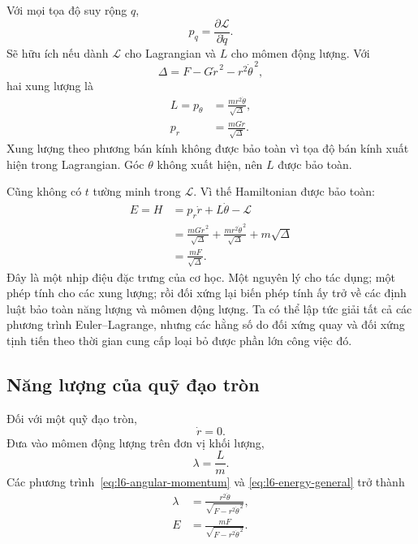 Với mọi tọa độ suy rộng \(q\),
\begin{equation}
p_q=\frac{\partial\mathcal L}{\partial\dot q}.
\end{equation}
Sẽ hữu ích nếu dành \(\mathcal L\) cho Lagrangian và \(L\) cho mômen động lượng. Với
\begin{equation}
\Delta=F-G\dot r^{\,2}-r^{2}\dot\theta^{\,2},
\end{equation}
hai xung lượng là
\begin{align}
L=p_\theta
&=\frac{mr^{2}\dot\theta}{\sqrt{\Delta}},
\label{eq:l6-angular-momentum}\\
p_r
&=\frac{mG\dot r}{\sqrt{\Delta}}.
\label{eq:l6-radial-momentum}
\end{align}
Xung lượng theo phương bán kính không được bảo toàn vì tọa độ bán kính xuất hiện trong Lagrangian. Góc \(\theta\) không xuất hiện, nên \(L\) được bảo toàn.

Cũng không có \(t\) tường minh trong \(\mathcal L\). Vì thế Hamiltonian được bảo toàn:
\begin{align}
E=H
&=p_r\dot r+L\dot\theta-\mathcal L \\
&=\frac{mG\dot r^{\,2}}{\sqrt{\Delta}}
  +\frac{mr^{2}\dot\theta^{\,2}}{\sqrt{\Delta}}
  +m\sqrt{\Delta} \\
&=\frac{mF}{\sqrt{\Delta}}.
\label{eq:l6-energy-general}
\end{align}
Đây là một nhịp điệu đặc trưng của cơ học. Một nguyên lý cho tác dụng; một phép tính cho các xung lượng; rồi đối xứng lại biến phép tính ấy trở về các định luật bảo toàn năng lượng và mômen động lượng. Ta có thể lập tức giải tất cả các phương trình Euler--Lagrange, nhưng các hằng số do đối xứng quay và đối xứng tịnh tiến theo thời gian cung cấp loại bỏ được phần lớn công việc đó.

\subsection{Năng lượng của quỹ đạo tròn}

Đối với một quỹ đạo tròn,
\begin{equation}
\dot r=0.
\end{equation}
Đưa vào mômen động lượng trên đơn vị khối lượng,
\begin{equation}
\lambda=\frac{L}{m}.
\end{equation}
Các phương trình~\eqref{eq:l6-angular-momentum} và
\eqref{eq:l6-energy-general} trở thành
\begin{align}
\lambda
&=\frac{r^{2}\dot\theta}
{\sqrt{F-r^{2}\dot\theta^{\,2}}},
\label{eq:l6-lambda-circular}\\
E
&=\frac{mF}{\sqrt{F-r^{2}\dot\theta^{\,2}}}.
\label{eq:l6-energy-circular-first}
\end{align}

